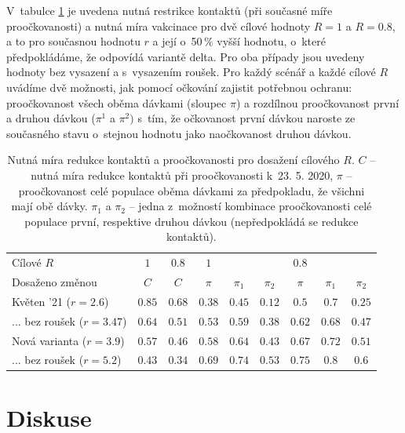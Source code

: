 V~tabulce \ref{tab:res} je uvedena nutná restrikce kontaktů (při současné
míře proočkovanosti) a nutná míra vakcinace pro dvě cílové hodnoty
$R=1$ a $R=0.8$, a to pro 
současnou hodnotu $r$ a její o~50\,\% vyšší hodnotu, o~které předpokládáme, že odpovídá variantě delta. Pro oba případy jsou uvedeny hodnoty bez vysazení a s~vysazením roušek. Pro každý scénář a každé
cílové $R$ uvádíme dvě možnosti, jak pomocí očkování zajistit potřebnou ochranu:
proočkovanost všech oběma dávkami (sloupec $\pi$) a rozdílnou proočkovanost
první a druhou dávkou ($\pi^{1}$ a $\pi^{2})$ s~tím, že očkovanost první dávkou naroste ze současného stavu o~stejnou hodnotu jako naočkovanost druhou dávkou.
\begin{table}
\begin{center}
\begin{tabular}{l|c|c|ccc|ccc}									 Cílové $R$	& $1$	& $0.8$	& $1$	&	&	& $0.8$	&	&	\\  Dosaženo změnou	& $C$	& $C$	& $\pi$	& $\pi_1$	& $\pi_2$	& $\pi$	& $\pi_1$	& $\pi_2$	\\ \hline Květen '21 ($r=2.6$)	& $0.85$	& $0.68$	& $0.38$	& $0.45$	& $0.12$	& $0.5$	& $0.7$	& $0.25$	\\ ... bez roušek ($r=3.47$)	& $0.64$	& $0.51$	& $0.53$	& $0.59$	& $0.38$	& $0.62$	& $0.68$	& $0.47$	\\ Nová varianta ($r=3.9$)	& $0.57$	& $0.46$	& $0.58$	& $0.64$	& $0.43$	& $0.67$	& $0.72$	& $0.51$	\\ ... bez roušek ($r=5.2$)	& $0.43$	& $0.34$	& $0.69$	& $0.74$	& $0.53$	& $0.75$	& $0.8$	& $0.6$	\\ 
\end{tabular}		
\caption{Nutná míra redukce kontaktů a proočkovanosti pro dosažení cílového $R$. $C$ -- nutná míra redukce kontaktů při proočkovanosti k~23. 5. 2020, $\pi$ -- proočkovanost celé populace oběma dávkami za předpokladu, že všichni mají obě dávky. $\pi_1$ a $\pi_2$ -- jedna z~možností kombinace proočkovanosti celé populace první, respektive druhou dávkou (nepředpokládá se redukce kontaktů). }							 	 
\label{tab:res}
\end{center}

\end{table}


\section*{Diskuse}

